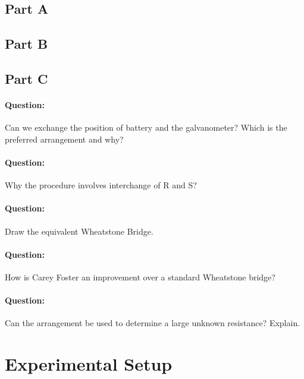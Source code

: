 \subsection*{Part A}


\subsection*{Part B}


\subsection*{Part C}


\begin{question}
\paragraph{Question:} Can we exchange the position of battery and the galvanometer? Which is the preferred arrangement and why?~\\
\paragraph{Question:} Why the procedure involves interchange of R and S?~\\
\paragraph{Question:} Draw the equivalent Wheatstone Bridge.~\\
\paragraph{Question:} How is Carey Foster an improvement over a standard Wheatstone bridge?~\\
\paragraph{Question:} Can the arrangement be used to determine a large unknown resistance? Explain.
\end{question}


\section*{Experimental Setup}





